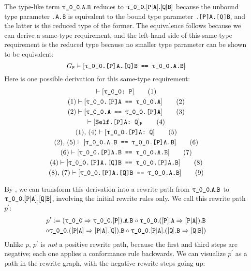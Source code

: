 \documentclass[../generics]{subfiles}
\begin{document}
\begin{example}
The type-like term $\ttgp{0}{0}.\texttt{A}.\texttt{B}$ reduces to $\ttgp{0}{0}.\assocsym{P}{A}.\assocsym{Q}{B}$ because the unbound type parameter \texttt{.A.B} is equivalent to the bound type parameter \texttt{.[P]A.[Q]B}, and the latter is the reduced type of the former. The equivalence follows because we can derive a same-type requirement, and the left-hand side of this same-type requirement is the reduced type because no smaller type parameter can be shown to be equivalent:
\[\GP\vDash\SameReq{\ttgp{0}{0}.[P]A.[Q]B}{\ttgp{0}{0}.A.B}\]
Here is one possible derivation for this same-type requirement:
\begin{gather*}
\vdash\ConfReq{\ttgp{0}{0}}{P}\tag{1}\\
(1)\vdash\SameReq{\ttgp{0}{0}.[P]A}{\ttgp{0}{0}.A}\tag{2}\\
(2)\vdash\SameReq{\ttgp{0}{0}.A}{\ttgp{0}{0}.[P]A}\tag{3}\\
\vdash\ConfReq{Self.[P]A}{Q}_\texttt{P}\tag{4}\\
(1),\,(4)\vdash\ConfReq{\ttgp{0}{0}.[P]A}{Q}\tag{5}\\
(2),\,(5)\vdash\SameReq{\ttgp{0}{0}.A.B}{\ttgp{0}{0}.[P]A.B}\tag{6}\\
(6)\vdash\SameReq{\ttgp{0}{0}.[P]A.B}{\ttgp{0}{0}.A.B}\tag{7}\\
(4)\vdash\SameReq{\ttgp{0}{0}.[P]A.[Q]B}{\ttgp{0}{0}.[P]A.B}\tag{8}\\
(8),\,(7)\vdash\SameReq{\ttgp{0}{0}.[P]A.[Q]B}{\ttgp{0}{0}.A.B}\tag{9}
\end{gather*}

By , we can transform this derivation into a rewrite path from $\ttgp{0}{0}.\texttt{A}.\texttt{B}$ to $\ttgp{0}{0}.\assocsym{P}{A}.\assocsym{Q}{B}$, involving the initial rewrite rules only. We call this rewrite path $p^\prime$:
\begin{multline*}
p^\prime := (\ProtoConfInv{\ttgp{0}{0}}{P}).\texttt{A}.\texttt{B} \circ \ttgp{0}{0}.(\AssocIntro{P}{A}).\texttt{B}\\
\circ \ttgp{0}{0}.(\ProtoConfInv{\assocsym{P}{A}}{Q}).\texttt{B} \circ \ttgp{0}{0}.\assocsym{P}{A}.(\AssocIntro{Q}{B})
\end{multline*}
Unlike $p$, $p^\prime$ is \emph{not} a positive rewrite path, because the first and third steps are negative; each one applies a conformance rule backwards. We can visualize $p^\prime$ as a path in the rewrite graph, with the negative rewrite steps going up:
\begin{center}
\end{center}


\end{example}
\end{document}
